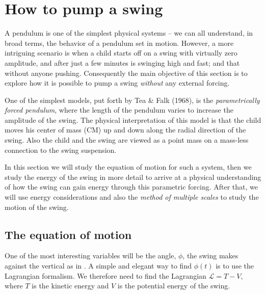 \documentclass[10pt,letter, swedish, english,%
]{article}
\begin{document}





\section{How to pump a swing}
A pendulum is one of the simplest physical systems -- we can all
understand, in broad terms, the behavior of a pendulum set in
motion. However, a more intriguing scenario is when a child starts off
on a swing with virtually zero amplitude, and after just a few minutes
is swinging high and fast; and that without anyone pushing.
Consequently the main objective of this section is to explore how it
is possible to pump a swing \emph{without} any external forcing. 

One of the simplest models, put forth by Tea \& Falk (1968), %
is the \emph{parametrically forced
  pendulum}, where the length of the pendulum varies to increase the
amplitude of the swing. The physical interpretation of this model is
that the child moves his center of mass (CM) up and down along the radial
direction of the swing. Also the child and the swing are viewed as a
point mass on a mass-less connection to the swing suspension. 

In this section we will study the equation of motion for such a system,
then we study the energy of the swing in more detail to arrive at a
physical understanding of how the swing can gain energy through this
parametric forcing. 
After that, we will use energy considerations and also the
\emph{method of multiple scales} to study the motion of the swing.

\subsection{The equation of motion}
One of the most interesting variables will be the angle, $\phi$,
the swing makes against the vertical as in . 
A simple and elegant way to find $\phi(t)$ is to use the Lagrangian
formalism. We therefore need to find the Lagrangian $\mathcal{L}=T-V$,
where $T$ is the kinetic energy and $V$ is the potential energy of the
swing. 
\end{document}
